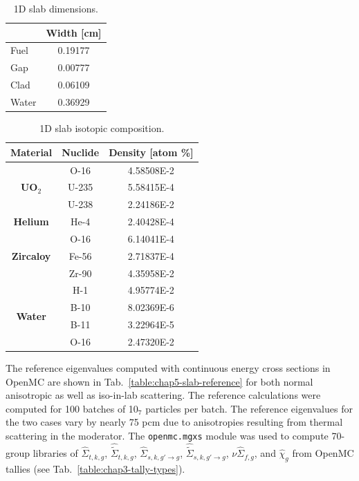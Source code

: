 \begin{table}[h!]
  \centering
  \caption[1D slab dimensions]{1D slab dimensions.}
  \small
  \label{table:chap5-slab-widths} 
  \vspace{6pt}
  \begin{tabular}{l c}
  \toprule
  \rowcolor{lightgray}
  \multicolumn{1}{c}{\bf Material} &
  \multicolumn{1}{c}{\bf Width [cm]} \\
  \midrule
  Fuel &  0.19177 \\
  Gap &   0.00777 \\
  Clad &  0.06109 \\
  Water & 0.36929 \\
  \bottomrule
\end{tabular}
\end{table}

\begin{table}[h!]
  \centering
  \caption[1D slab isotopic composition]{1D slab isotopic composition.}
  \small
  \label{table:chap5-slab-isotopes} 
  \vspace{6pt}
  \begin{tabular}{c c c}
  \toprule
  \rowcolor{lightgray}
  {\bf Material} &
  {\bf Nuclide} &
  {\bf Density [atom \%]} \\
  \midrule
  \multirow{3}{*}{\bf UO$_2$} & O-16 &  4.58508E-2 \\
  & U-235 & 5.58415E-4 \\
  & U-238 & 2.24186E-2 \\
  \midrule
  \multirow{1}{*}{\bf Helium} & He-4 & 2.40428E-4 \\
  \midrule
  \multirow{3}{*}{\bf Zircaloy} & O-16 &  6.14041E-4 \\
  & Fe-56 & 2.71837E-4 \\
  & Zr-90 & 4.35958E-2 \\
  \midrule
  \multirow{4}{*}{\bf Water} & H-1 &  4.95774E-2 \\
  & B-10 & 8.02369E-6 \\
  & B-11 & 3.22964E-5 \\
  & O-16 & 2.47320E-2 \\
  \bottomrule
\end{tabular}
\end{table}

The reference eigenvalues computed with continuous energy cross sections in OpenMC are shown in Tab.~\ref{table:chap5-slab-reference} for both normal anisotropic as well as iso-in-lab scattering. The reference calculations were computed for 100 batches of 10$_{7}$ particles per batch. The reference eigenvalues for the two cases vary by nearly 75 \ac{pcm} due to anisotropies resulting from thermal scattering in the moderator. The \texttt{openmc.mgxs} module was used to compute 70-group libraries of $\hat{\Sigma}_{t,k,g}$, $\hat{\tilde{\Sigma}}_{t,k,g}$, $\hat{\Sigma}_{s,k,g'\rightarrow g}$, $\hat{\tilde{\Sigma}}_{s,k,g'\rightarrow g}$, $\nu\hat{\Sigma}_{f,g}$, and $\hat{\chi}_{g}$ from OpenMC tallies (see Tab.~\ref{table:chap3-tally-types}).

